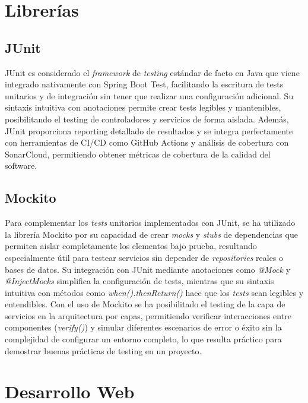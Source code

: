 \section{Librerías}\label{librerias}

\subsection{JUnit}\label{junit}
JUnit es considerado el \emph{framework} de \emph{testing} estándar de facto en Java que viene integrado nativamente con Spring Boot Test, facilitando la escritura de tests unitarios y de integración sin tener que realizar una configuración adicional. Su sintaxis intuitiva con anotaciones permite crear tests legibles y mantenibles, posibilitando el testing de controladores y servicios de forma aislada. Además, JUnit proporciona reporting detallado de resultados y se integra perfectamente con herramientas de CI/CD como GitHub Actions y análisis de cobertura con SonarCloud, permitiendo obtener métricas de cobertura de la calidad del software.

\subsection{Mockito}\label{mockito}
Para complementar los \emph{tests} unitarios implementados con JUnit, se ha utilizado la librería Mockito por su capacidad de crear \emph{mocks} y \emph{stubs} de dependencias que permiten aislar completamente los elementos bajo prueba, resultando especialmente útil para testear servicios sin depender de \emph{repositories} reales o bases de datos. Su integración con JUnit mediante anotaciones como \emph{@Mock} y \emph{@InjectMocks} simplifica la configuración de tests, mientras que su sintaxis intuitiva con métodos como \emph{when().thenReturn()} hace que los \emph{tests} sean legibles y entendibles. Con el uso de Mockito se ha posibilitado el testing de la capa de servicios en la arquitectura por capas, permitiendo verificar interacciones entre componentes (\emph{verify()}) y simular diferentes escenarios de error o éxito sin la complejidad de configurar un entorno completo, lo que resulta práctico para demostrar buenas prácticas de testing en un proyecto.

\section{Desarrollo Web}\label{desarrollo-web}

